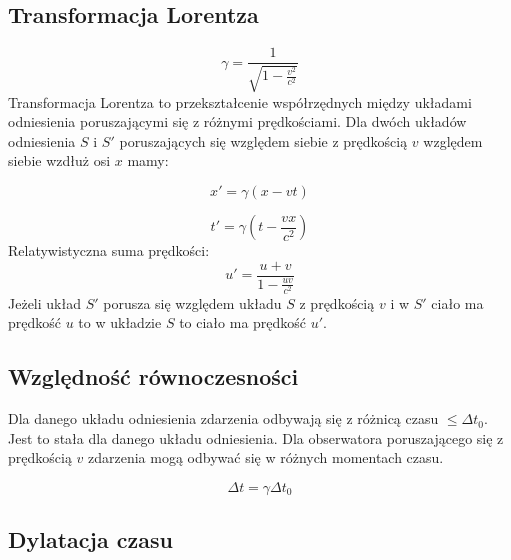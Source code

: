 \documentclass{../notatki}
\begin{document}
\subsection{Transformacja Lorentza}

$$
\gamma = \frac{1}{\sqrt{1 - \frac{v^2}{c^2}}}
$$
Transformacja Lorentza to przekształcenie współrzędnych między układami
odniesienia poruszającymi się z różnymi prędkościami. Dla dwóch układów
odniesienia $S$ i $S'$ poruszających się względem siebie z prędkością $v$
względem siebie wzdłuż osi $x$ mamy:

$$
x' = \gamma(x - vt)
$$

$$
t' = \gamma(t - \frac{vx}{c^2})
$$
Relatywistyczna suma prędkości:
$$
u' = \frac{u + v}{1 - \frac{uv}{c^2}}
$$
Jeżeli układ $S'$ porusza się względem układu $S$ z prędkością $v$ i
w $S'$ ciało
ma prędkość $u$ to w układzie $S$ to ciało ma prędkość $u'$.

\begin{figure*}[h]
  \centering
\end{figure*}

\subsection{Względność równoczesności}

Dla danego układu odniesienia zdarzenia odbywają się z różnicą czasu
$\le \Delta t_0$. Jest to stała dla danego układu odniesienia.
Dla obserwatora poruszającego się z prędkością $v$ zdarzenia
mogą odbywać się w różnych momentach czasu.

$$
\Delta t = \gamma \Delta t_0
$$

\subsection{Dylatacja czasu}
\end{document}

